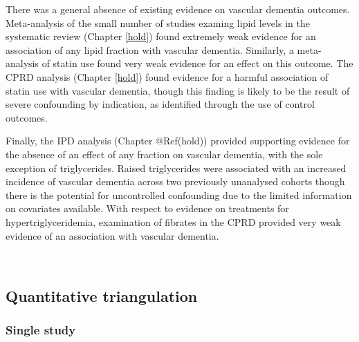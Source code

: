 \documentclass[a4paper, twoside]{templates/ociamthesis}
\begin{document}
There was a general absence of existing evidence on vascular dementia outcomes. Meta-analysis of the small number of studies examing lipid levels in the systematic review (Chapter \ref{hold}) found extremely weak evidence for an association of any lipid fraction with vascular dementia. Similarly, a meta-analysis of statin use found very weak evidence for an effect on this outcome. The CPRD analysis (Chapter \ref{hold}) found evidence for a harmful association of statin use with vascular dementia, though this finding is likely to be the result of severe confounding by indication, as identified through the use of control outcomes.

Finally, the IPD analysis (Chapter @Ref(hold)) provided supporting evidence for the absence of an effect of any fraction on vascular dementia, with the sole exception of triglycerides. Raised triglycerides were associated with an increased incidence of vascular dementia across two previously unanalysed cohorts though there is the potential for uncontrolled confounding due to the limited information on covariates available. With respect to evidence on treatments for hypertriglyceridemia, examination of fibrates in the CPRD provided very weak evidence of an association with vascular dementia.

~

\hypertarget{quantitative-triangulation-1}{%
\subsection{Quantitative triangulation}\label{quantitative-triangulation-1}}

\hypertarget{single-study}{%
\subsubsection{Single study}\label{single-study}}
\end{document}
